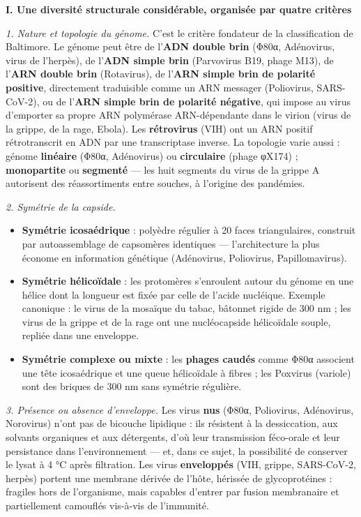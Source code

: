 \documentclass[11pt,a4paper]{article}
\providecommand{\tightlist}{\setlength{\itemsep}{0pt}\setlength{\parskip}{0pt}}
\begin{document}
\textbf{I. Une diversité structurale considérable, organisée par quatre critères}

\emph{1. Nature et topologie du génome.} C'est le critère fondateur de la classification de Baltimore. Le génome peut être de l'\textbf{ADN double brin} (Φ80α, Adénovirus, virus de l'herpès), de l'\textbf{ADN simple brin} (Parvovirus B19, phage M13), de l'\textbf{ARN double brin} (Rotavirus), de l'\textbf{ARN simple brin de polarité positive}, directement traduisible comme un ARN messager (Poliovirus, SARS-CoV-2), ou de l'\textbf{ARN simple brin de polarité négative}, qui impose au virus d'emporter sa propre ARN polymérase ARN-dépendante dans le virion (virus de la grippe, de la rage, Ebola). Les \textbf{rétrovirus} (VIH) ont un ARN positif rétrotranscrit en ADN par une transcriptase inverse. La topologie varie aussi : génome \textbf{linéaire} (Φ80α, Adénovirus) ou \textbf{circulaire} (phage φX174) ; \textbf{monopartite} ou \textbf{segmenté} --- les huit segments du virus de la grippe A autorisent des réassortiments entre souches, à l'origine des pandémies.

\emph{2. Symétrie de la capside.}

\begin{itemize}
\tightlist
\item
  \textbf{Symétrie icosaédrique} : polyèdre régulier à 20 faces triangulaires, construit par autoassemblage de capsomères identiques --- l'architecture la plus économe en information génétique (Adénovirus, Poliovirus, Papillomavirus).
\item
  \textbf{Symétrie hélicoïdale} : les protomères s'enroulent autour du génome en une hélice dont la longueur est fixée par celle de l'acide nucléique. Exemple canonique : le virus de la mosaïque du tabac, bâtonnet rigide de 300 nm ; les virus de la grippe et de la rage ont une nucléocapside hélicoïdale souple, repliée dans une enveloppe.
\item
  \textbf{Symétrie complexe ou mixte} : les \textbf{phages caudés} comme Φ80α associent une tête icosaédrique et une queue hélicoïdale à fibres ; les Poxvirus (variole) sont des briques de 300 nm sans symétrie régulière.
\end{itemize}

\emph{3. Présence ou absence d'enveloppe.} Les virus \textbf{nus} (Φ80α, Poliovirus, Adénovirus, Norovirus) n'ont pas de bicouche lipidique : ils résistent à la dessiccation, aux solvants organiques et aux détergents, d'où leur transmission féco-orale et leur persistance dans l'environnement --- et, dans ce sujet, la possibilité de conserver le lysat à 4 °C après filtration. Les virus \textbf{enveloppés} (VIH, grippe, SARS-CoV-2, herpès) portent une membrane dérivée de l'hôte, hérissée de glycoprotéines : fragiles hors de l'organisme, mais capables d'entrer par fusion membranaire et partiellement camouflés vis-à-vis de l'immunité.
\end{document}
